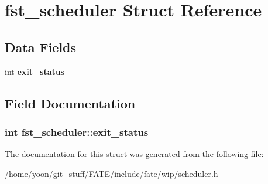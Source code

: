 \hypertarget{structfst__scheduler}{\section{fst\-\_\-scheduler Struct Reference}
\label{structfst__scheduler}
}
\subsection*{Data Fields}
\begin{DoxyCompactItemize}
\item 
\hypertarget{structfst__scheduler_a65093bd68a989db0dcd6e70afcf78d40}{int {\bfseries exit\-\_\-status}}\label{structfst__scheduler_a65093bd68a989db0dcd6e70afcf78d40}

\end{DoxyCompactItemize}


\subsection{Field Documentation}
\hypertarget{structfst__scheduler_a65093bd68a989db0dcd6e70afcf78d40}{
\subsubsection[{exit\-\_\-status}]{\setlength{\rightskip}{0pt plus 5cm}int fst\-\_\-scheduler\-::exit\-\_\-status}}\label{structfst__scheduler_a65093bd68a989db0dcd6e70afcf78d40}


The documentation for this struct was generated from the following file\-:\begin{DoxyCompactItemize}
\item 
/home/yoon/git\-\_\-stuff/\-F\-A\-T\-E/include/fate/wip/scheduler.\-h\end{DoxyCompactItemize}
